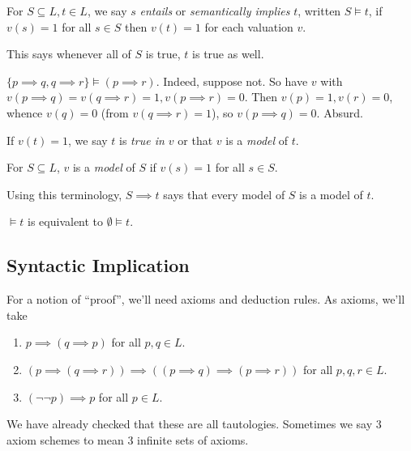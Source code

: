 \documentclass[a4paper]{article}
\begin{document}
\begin{definition}[Entailment]
  For \(S \subseteq L, t \in L\), we say \(s\) \emph{entails} or \emph{semantically implies} \(t\), written \(S \models t\), if \(v(s) = 1\) for all \(s \in S\) then \(v(t) = 1\) for each valuation \(v\).
\end{definition}

This says whenever all of \(S\) is true, \(t\) is true as well.

\begin{eg}
  \(\{p \implies q, q \implies r\} \models (p \implies r)\). Indeed, suppose not. So have \(v\) with \(v(p \implies q) = v(q \implies r) = 1, v(p \implies r) = 0\). Then \(v(p) = 1, v(r) = 0\), whence \(v(q) = 0\) (from \(v(q \implies r) = 1\)), so \(v(p \implies q) = 0\). Absurd.
\end{eg}

\begin{definition}[Model]
  If \(v(t) = 1\), we say \(t\) is \emph{true in \(v\)} or that \(v\) is a \emph{model} of \(t\).

  For \(S \subseteq L\), \(v\) is a \emph{model} of \(S\) if \(v(s) = 1\) for all \(s \in S\).
\end{definition}

Using this terminology, \(S \implies t\) says that every model of \(S\) is a model of \(t\).

\begin{note}
  \(\models t\) is equivalent to \(\emptyset \models t\).
\end{note}

\subsection{Syntactic Implication}

For a notion of ``proof'', we'll need axioms and deduction rules. As axioms, we'll take
\begin{enumerate}
\item \(p \implies (q \implies p)\) for all \(p, q \in L\).
\item \((p \implies (q \implies r)) \implies ((p \implies q) \implies (p \implies r))\) for all \(p, q, r \in L\).
\item \((\neg \neg p) \implies p\) for all \(p \in L\).
\end{enumerate}

\begin{note}
  We have already checked that these are all tautologies. Sometimes we say 3 axiom schemes to mean 3 infinite sets of axioms.
\end{note}
\end{document}
